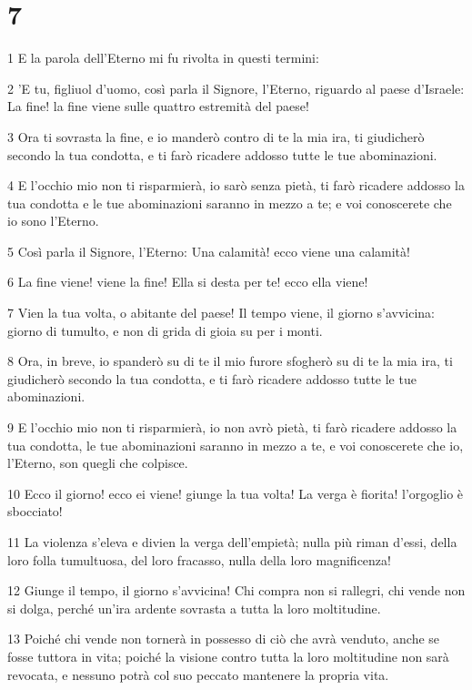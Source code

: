 \chapter{7}

\par 1 E la parola dell'Eterno mi fu rivolta in questi termini:
\par 2 'E tu, figliuol d'uomo, così parla il Signore, l'Eterno, riguardo al paese d'Israele: La fine! la fine viene sulle quattro estremità del paese!
\par 3 Ora ti sovrasta la fine, e io manderò contro di te la mia ira, ti giudicherò secondo la tua condotta, e ti farò ricadere addosso tutte le tue abominazioni.
\par 4 E l'occhio mio non ti risparmierà, io sarò senza pietà, ti farò ricadere addosso la tua condotta e le tue abominazioni saranno in mezzo a te; e voi conoscerete che io sono l'Eterno.
\par 5 Così parla il Signore, l'Eterno: Una calamità! ecco viene una calamità!
\par 6 La fine viene! viene la fine! Ella si desta per te! ecco ella viene!
\par 7 Vien la tua volta, o abitante del paese! Il tempo viene, il giorno s'avvicina: giorno di tumulto, e non di grida di gioia su per i monti.
\par 8 Ora, in breve, io spanderò su di te il mio furore sfogherò su di te la mia ira, ti giudicherò secondo la tua condotta, e ti farò ricadere addosso tutte le tue abominazioni.
\par 9 E l'occhio mio non ti risparmierà, io non avrò pietà, ti farò ricadere addosso la tua condotta, le tue abominazioni saranno in mezzo a te, e voi conoscerete che io, l'Eterno, son quegli che colpisce.
\par 10 Ecco il giorno! ecco ei viene! giunge la tua volta! La verga è fiorita! l'orgoglio è sbocciato!
\par 11 La violenza s'eleva e divien la verga dell'empietà; nulla più riman d'essi, della loro folla tumultuosa, del loro fracasso, nulla della loro magnificenza!
\par 12 Giunge il tempo, il giorno s'avvicina! Chi compra non si rallegri, chi vende non si dolga, perché un'ira ardente sovrasta a tutta la loro moltitudine.
\par 13 Poiché chi vende non tornerà in possesso di ciò che avrà venduto, anche se fosse tuttora in vita; poiché la visione contro tutta la loro moltitudine non sarà revocata, e nessuno potrà col suo peccato mantenere la propria vita.
